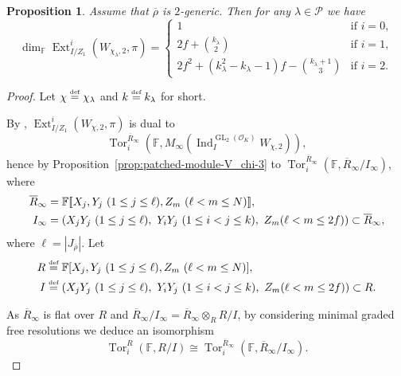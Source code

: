 \documentclass[JEP,XML,SOM,Unicode,NoFloatCountersInSection, NoEqCountersInSection,published]{cedram}
\let\ovl\overline
\newcommand{\defeq}{\stackrel{\textrm{\tiny{\upshape{def}}}}{=}}
\newcommand{\F}{\mathbb{F}}
\newcommand{\cO}{\mathcal{O}}
\renewcommand{\P}{\mathscr P}
\newcommand{\brho}{\overline{\rho}}
\newcommand{\bbra}[1]{[\mkern-3mu[#1]\mkern-3mu]}
\DeclareMathOperator{\Ext}{Ext}
\DeclareMathOperator{\GL}{GL}
\DeclareMathOperator{\Ind}{Ind}
\DeclareMathOperator{\Tor}{Tor}
\theoremstyle{plain}
\newtheorem{prop}{Proposition}[subsection]
\theoremstyle{definition}
\begin{document}
\begin{prop}\label{prop:ext-i}
{Assume that $\brho$ is $2$-generic}.
Then for any $\lambda \in \P$ we have
\begin{equation*}
\dim_\F \Ext^i_{I/Z_1}(W_{\chi_\lambda,2},\pi) =
\begin{cases}
1 & \text{if $i = 0$},\\
2f + \binom{k_\lambda}{2} & \text{if $i = 1$,}\\
2f^2+(k_\lambda^2-k_\lambda-1)f-\binom{k_\lambda+1}3 & \text{if $i = 2$.}
\end{cases}
\end{equation*}
\end{prop}

\begin{proof}
Let $\chi \defeq \chi_\lambda$ and $k \defeq k_\lambda$ for short.

By \cite[Lem.\,2.6.2]{BHHMS4}, $\Ext^i_{I/Z_1}(W_{\chi,2},\pi)$ is dual to
\[
\Tor_i^{\ovl R_\infty}(\F,M_\infty(\Ind_I^{\GL_2(\cO_K)} W_{\chi,2})),
\]
hence by Pro\-position~\ref{prop:patched-module-V_chi-3} to
$\Tor_i^{\ovl R_\infty}(\F,\ovl R_\infty/I_\infty)$, where
\begin{align*}
\ovl R_\infty &= \F\bbra{X_j, Y_j\ (1 \le j \le \ell), Z_m\ (\ell < m \le N)},\\
I_\infty &= (X_jY_j\ (1 \le j \le \ell),\ Y_i Y_j\ (1 \le i < j \le k), \ Z_m (\ell < m \le 2f))\subset \ovl R_{\infty},
\end{align*}
where $\ell = |J_{\brho}|$.
Let
\begin{align*}
R &\defeq \F[X_j, Y_j\ (1 \le j \le \ell), Z_m\ (\ell < m \le N)], \\
I &\defeq (X_jY_j\ (1 \le j \le \ell),\ Y_i Y_j\ (1 \le i < j \le k), \ Z_m (\ell < m \le 2f))\subset R.
\end{align*}

As $\ovl R_{\infty}$ is flat over $R$ and $\ovl R_{\infty}/I_{\infty}=\ovl R_{\infty}\otimes_{R}R/I$, by considering minimal graded free resolutions we deduce an isomorphism
\begin{equation*}
\Tor_i^{R}(\F,R/I) \cong \Tor_i^{\ovl R_\infty}(\F,\ovl R_\infty/I_\infty).
\end{equation*}


\end{proof}
\end{document}
